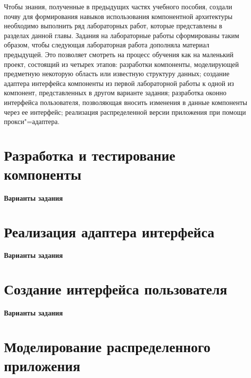 \documentclass[a4paper,openany,twoside,draft]{book}
\begin{document}
Чтобы знания, полученные в предыдущих частях учебного пособия, создали почву для формирования навыков использования компонентной архитектуры необходимо выполнить ряд лабораторных работ, которые представлены в разделах данной главы.  Задания на лабораторные работы сформированы таким образом, чтобы следующая лабораторная работа дополняла материал предыдущей.  Это позволяет смотреть на процесс обучения как на маленький проект, состоящий из четырех этапов: разработки компоненты, моделирующей предметную некоторую область или известную структуру данных; создание адаптера интерфейса компоненты из первой лабораторной работы к одной из компонент, представленных в другом варианте задания; разработка оконно интерфейса пользователя, позволяющая вносить изменения в данные компоненты через ее интерфейс; реализация распределенной версии приложения при помощи прокси"=адаптера.

\section{Разработка и тестирование компоненты}
\label{sec:labcomp}
\newpage

\paragraph{Варианты задания}
\newpage

\section{Реализация адаптера интерфейса}
\label{sec:labadapter}
\newpage

\paragraph{Варианты задания}
\newpage

\section{Создание интерфейса пользователя}
\label{sec:labinterface}

\newpage
\paragraph{Варианты задания}
\newpage

\section{Моделирование распределенного приложения}
\label{sec:labmodel}
\newpage
\end{document}
